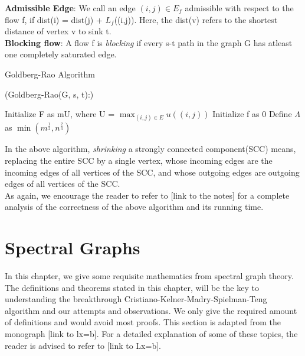 \documentclass[BTech]{iitmdiss}
\begin{document}
	    
	    \textbf{Admissible Edge}: We call an edge $(i, j) \in E_f$ admissible with respect to the flow f, if dist(i) = dist(j) + $L_f$((i,j)). Here,
	    the dist(v) refers to the shortest distance of vertex v to sink t. \\
	    
	    \textbf{Blocking flow}: A flow f is \textit{blocking} if every s-t path in the graph G has atleast one completely saturated edge. \\
	    
	    \begin{algorithm}[H]
	      \caption{Goldberg-Rao Algorithm}
	      
	      \Begin(Goldberg-Rao{(G, s, t)}:)
	      {
		Initialize F as mU, where U =  $\displaystyle\max_{(i,j) \in E} u((i,j))$ \;
		Initialize f as 0 \;
		Define $\varLambda$ as $\min(m^{\frac{1}{2}}, n^{\frac{2}{3}})$ \;
		
	      }
	    \end{algorithm}
	    
	    In the above algorithm, \textit{shrinking} a strongly connected component(SCC) means, replacing the entire SCC by a 
	    single vertex, whose incoming edges are the incoming edges of all vertices of the SCC, and whose outgoing edges
	    are outgoing edges of all vertices of the SCC. \\
	    
	    As again, we encourage the reader to refer to [link to the notes] for a complete analysis of the correctness of the above algorithm
	    and its running time.
	 \chapter{Spectral Graphs}
	     In this chapter, we give some requisite mathematics from spectral graph theory. The definitions and theorems stated in this chapter,
	     will be the key to understanding the breakthrough Cristiano-Kelner-Madry-Spielman-Teng algorithm and our attempts and observations. We only give the required amount of definitions and would avoid most proofs. This section is adapted from the monograph [link to lx=b].
	     For a detailed explanation of some of these topics, the reader is advised to refer to [link to Lx=b].\\
	     
\end{document}
